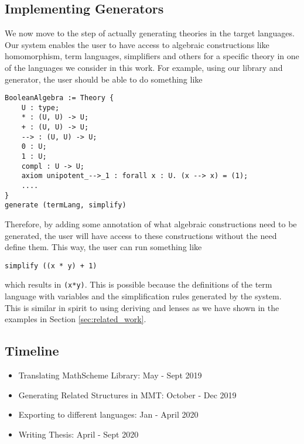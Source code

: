\subsection{Implementing Generators}
\label{sec:generators}
We now move to the step of actually generating theories in the target languages. 
Our system enables the user to have access to algebraic constructions like homomorphism, term 
languages, simplifiers and others for a specific theory in one of the languages we consider in this 
work. For example, using our library and generator, the user should be able to do something like 
\begin{lstlisting}
BooleanAlgebra := Theory {
    U : type;
    * : (U, U) -> U;
    + : (U, U) -> U;
    --> : (U, U) -> U;
    0 : U;
    1 : U;
    compl : U -> U;
    axiom unipotent_-->_1 : forall x : U. (x --> x) = (1);
    ....
}
generate (termLang, simplify)
\end{lstlisting}
Therefore, by adding some annotation of what algebraic constructions need to be generated, the 
user will have access to these constructions without the need define them. This way, the user can 
run something like 
\begin{lstlisting}
simplify ((x * y) + 1)
\end{lstlisting}
which results in \verb|(x*y)|. This is possible because the definitions of the term language with 
variables and the simplification rules generated by the system. This is similar in spirit to using 
deriving and lenses as we have shown in the examples in Section \ref{sec:related_work}.

\subsection{Timeline}
\begin{itemize}
	\item Translating MathScheme Library: May - Sept 2019
	\item Generating Related Structures in MMT: October - Dec 2019 
	\item Exporting to different languages: Jan - April 2020 
	\item Writing Thesis: April - Sept 2020 
\end{itemize}
